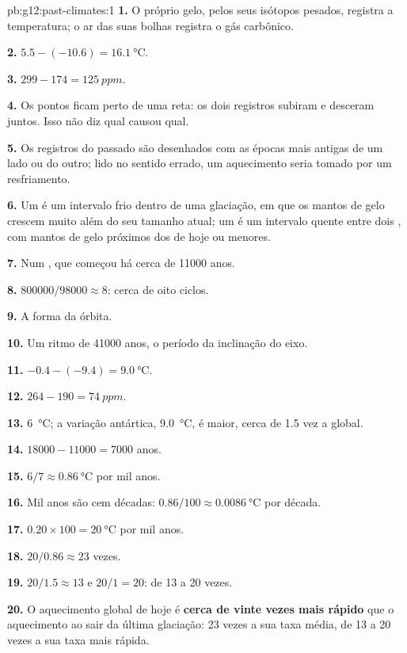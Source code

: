 \begin{solution}{pb:g12:past-climates:1}
\textbf{1.} O próprio gelo, pelos seus isótopos pesados, registra a
temperatura; o ar das suas bolhas registra o gás carbônico.

\textbf{2.} $5.5 - (-10.6) = \qty{16.1}{\degreeCelsius}$.

\textbf{3.} $299 - 174 = \qty{125}{ppm}$.

\textbf{4.} Os pontos ficam perto de uma reta: os dois registros subiram e
desceram juntos. Isso não diz qual causou qual.

\textbf{5.} Os registros do passado são desenhados com as épocas mais
antigas de um lado ou do outro; lido no sentido errado, um aquecimento
seria tomado por um resfriamento.

\textbf{6.} Um  é um intervalo frio dentro de uma glaciação,
em que os mantos de gelo crescem muito além do seu tamanho atual; um
 é um intervalo quente entre dois , com mantos
de gelo próximos dos de hoje ou menores.

\textbf{7.} Num , que começou há cerca de \num{11000} anos.

\textbf{8.} $\num{800000}/\num{98000} \approx 8$: cerca de oito ciclos.

\textbf{9.} A forma da órbita.

\textbf{10.} Um ritmo de \num{41000} anos, o período da inclinação do
eixo.

\textbf{11.} $-0.4 - (-9.4) = \qty{9.0}{\degreeCelsius}$.

\textbf{12.} $264 - 190 = \qty{74}{ppm}$.

\textbf{13.} \qty{6}{\degreeCelsius}; a variação antártica, \qty{9.0}{\degreeCelsius},
é maior, cerca de 1.5 vez a global.

\textbf{14.} $\num{18000} - \num{11000} = \num{7000}$ anos.

\textbf{15.} $6/7 \approx \qty{0.86}{\degreeCelsius}$ por mil anos.

\textbf{16.} Mil anos são cem décadas: $0.86/100 \approx
\qty{0.0086}{\degreeCelsius}$ por década.

\textbf{17.} $0.20 \times 100 = \qty{20}{\degreeCelsius}$ por mil anos.

\textbf{18.} $20/0.86 \approx 23$ vezes.

\textbf{19.} $20/1.5 \approx 13$ e $20/1 = 20$: de 13 a 20 vezes.

\textbf{20.} O aquecimento global de hoje é \textbf{cerca de vinte vezes mais
rápido} que o aquecimento ao sair da última glaciação: 23 vezes a sua taxa
média, de 13 a 20 vezes a sua taxa mais rápida.
\end{solution}
